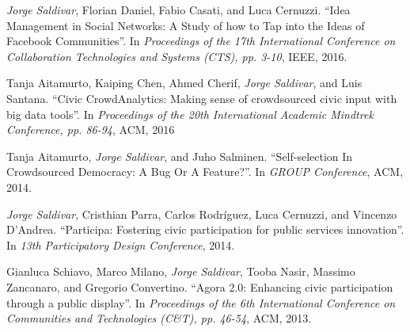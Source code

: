 \textit{Jorge Saldivar}, Florian Daniel, Fabio Casati, and Luca Cernuzzi. ``Idea Management in Social Networks: A Study of how to Tap into the Ideas of Facebook Communities''. In \textit{Proceedings of the 17th International Conference on Collaboration Technologies and Systems (CTS), pp. 3-10}, IEEE, 2016.

Tanja Aitamurto, Kaiping Chen, Ahmed Cherif, \textit{Jorge Saldivar}, and Luis Santana. ``Civic CrowdAnalytics: Making sense of crowdsourced civic input with big data tools''. In \textit{Proceedings of the 20th International Academic Mindtrek Conference, pp. 86-94}, ACM, 2016

Tanja Aitamurto, \textit{Jorge Saldivar}, and Juho Salminen. ``Self-selection In Crowdsourced Democracy: A Bug Or A Feature?''. In \textit{GROUP Conference}, ACM, 2014.

\textit{Jorge Saldivar}, Cristhian Parra, Carlos Rodríguez, Luca Cernuzzi, and Vincenzo D’Andrea. ``Participa: Fostering civic participation for public services innovation''. In \textit{13th Participatory Design Conference}, 2014.

Gianluca Schiavo, Marco Milano, \textit{Jorge Saldivar}, Tooba Nasir, Massimo Zancanaro, and Gregorio Convertino. ``Agora 2.0: Enhancing civic participation through a public display''. In \textit{Proceedings of the 6th International Conference on Communities and Technologies (C\&T), pp. 46-54}, ACM, 2013.

